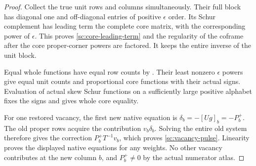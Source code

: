 \documentclass[11pt,a4paper]{amsart}
\numberwithin{equation}{section}
\theoremstyle{plain}
\theoremstyle{definition}
\begin{document}
\begin{proof}
Collect the true unit rows and columns simultaneously.  Their full
block has diagonal one and off-diagonal entries of positive
\(\epsilon\) order.  Its Schur complement has leading term the
complete core matrix, with the corresponding power of \(\epsilon\).
This proves \eqref{sc:core-leading-term} and the regularity of the
coframe after the core proper-corner powers are factored.  It keeps
the entire inverse of the unit block.

Equal whole functions have equal row counts by
.  Their least nonzero \(\epsilon\) powers give
equal unit counts and proportional core functions with their actual
signs.  Evaluation of actual skew Schur functions on a sufficiently
large positive alphabet fixes the signs and gives whole core
equality.

For one restored vacancy, the first new native equation is
\(\delta_b=-[Ug]_b=-P^+_b\).  The old proper rows acquire the
contribution \(v_b\delta_b\).  Solving the entire old system therefore
gives the correction \(P^+_bT^{-1}v_b\), which proves
\eqref{sc:vacancy-pulse}.  Linearity proves the displayed native
equations for any weights.  No other vacancy contributes at the
new column \(b\), and \(P^+_b\ne0\) by the actual numerator atlas.
\end{proof}
\end{document}
